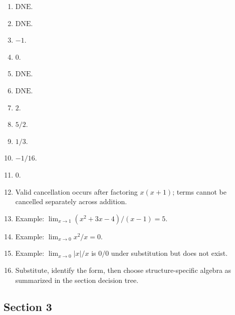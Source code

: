 \documentclass[11pt,openany]{book}
\theoremstyle{bgplain}
\newcommand{\DNE}{\mathrm{DNE}}
\begin{document}
\begin{enumerate}[label=\textbf{2.\arabic*}]
  \item \(\DNE\).
  \item \(\DNE\).
  \item \(-1\).
  \item \(0\).
  \item \(\DNE\).
  \item \(\DNE\).
  \item \(2\).
  \item \(5/2\).
  \item \(1/3\).
  \item \(-1/16\).
  \item \(0\).
  \item Valid cancellation occurs after factoring \(x(x+1)\); terms cannot be cancelled separately across addition.
  \item Example: \(\lim_{x\to1}(x^2+3x-4)/(x-1)=5\).
  \item Example: \(\lim_{x\to0}x^2/x=0\).
  \item Example: \(\lim_{x\to0}|x|/x\) is \(0/0\) under substitution but does not exist.
  \item Substitute, identify the form, then choose structure-specific algebra as summarized in the section decision tree.
\end{enumerate}

\subsection*{Section 3}
\end{document}

